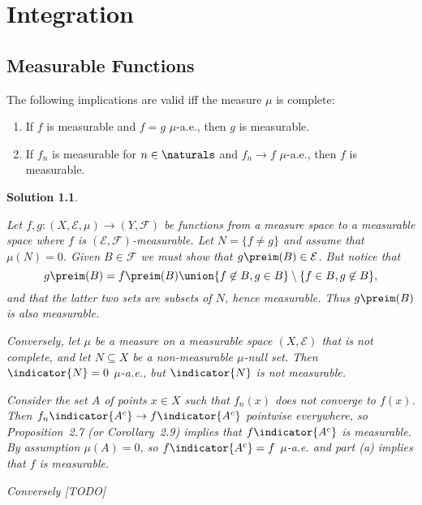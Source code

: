 \documentclass[article, a4paper, 11pt, oneside]{memoir}
\numberwithin{equation}{chapter}
\newcommand{\calE}{\mathcal{E}}
\newcommand{\calF}{\mathcal{F}}
\theoremstyle{nonumberplain}
\newtheorem{solution}{Solution}
\begin{document}
\chapter{Integration}

\section{Measurable Functions}

\begin{exerciseframed*}[10]
    The following implications are valid iff the measure $\mu$ is complete:
    \begin{enumerate}
        \item If $f$ is measurable and $f = g$ $\mu$-a.e., then $g$ is measurable.
        \item If $f_n$ is measurable for $n \in \naturals$ and $f_n \to f$ $\mu$-a.e., then $f$ is measurable.
    \end{enumerate}
\end{exerciseframed*}

\begin{solution}
\begin{solutionsec}
    \item Let $f,g \colon (X,\calE,\mu) \to (Y,\calF)$ be functions from a measure space to a measurable space where $f$ is $(\calE,\calF)$-measurable. Let $N = \{f \neq g\}$ and assume that $\mu(N) = 0$. Given $B \in \calF$ we must show that $g\preim(B) \in \calE$. But notice that
    \begin{equation*}
        g\preim(B)
            = f\preim(B) \union \{ f \not\in B, g \in B \} \setminus \{ f \in B, g \not\in B \},
    \end{equation*}
    and that the latter two sets are subsets of $N$, hence measurable. Thus $g\preim(B)$ is also measurable.

    Conversely, let $\mu$ be a measure on a measurable space $(X,\calE)$ that is not complete, and let $N \subseteq X$ be a non-measurable $\mu$-null set. Then $\indicator{N} = 0$ $\mu$-a.e., but $\indicator{N}$ is not measurable.

    \item Consider the set $A$ of points $x \in X$ such that $f_n(x)$ does not converge to $f(x)$. Then $f_n \indicator{A^c} \to f \indicator{A^c}$ pointwise everywhere, so Proposition~2.7 (or Corollary~2.9) implies that $f \indicator{A^c}$ is measurable. By assumption $\mu(A) = 0$, so $f \indicator{A^c} = f$ $\mu$-a.e. and part (a) implies that $f$ is measurable.
    
    Conversely [TODO]
\end{solutionsec}
\end{solution}
\end{document}

